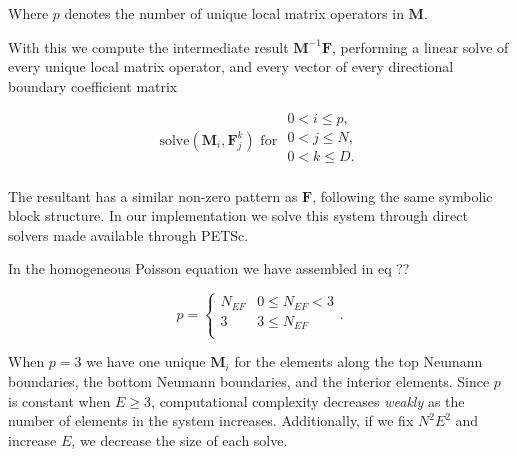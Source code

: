 \noindent 
Where $p$ denotes the number of unique local matrix operators in $\textbf{M}$. 

With this we compute the intermediate result $\textbf{M}^{-1}\textbf{F}$, performing a linear solve of every unique local matrix operator, and every vector of every directional boundary coefficient matrix 

\begin{equation}
	\text{solve}(\textbf{M}_{i}, \textbf{F}^{k}_j) \text{  for }
	\begin{array}{l}
		0 < i \leq p, \\
		0 < j \leq N, \\
		0 < k \leq D. \\ 
	\end{array}
\end{equation}

\noindent
The resultant has a similar non-zero pattern as $\textbf{F}$, following the same symbolic block structure. In our implementation we solve this system through direct solvers made available through PETSc. 

\begin{aside}
	In the homogeneous Poisson equation we have assembled in 
	eq {\color{red} ?? } 

	\begin{equation}
		p = \begin{cases}
		    N_{EF} &  0 \leq N_{EF} < 3 \\ 
			3 &  3 \leq N_{EF} \\ 
		\end{cases}.
	\end{equation} 

	\noindent 
	When $p = 3$ we have one unique $\textbf{M}_i$ for the elements 
	along the top Neumann boundaries, the bottom Neumann boundaries, 
	and the interior elements. Since $p$ is constant when 
	$E \geq 3$, computational complexity decreases \emph{weakly} 
	as the number of elements in the system increases. Additionally, 
	if we fix $N^2E^2$ and increase $E$, we decrease the size of 
	each solve.
\end{aside}

